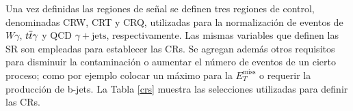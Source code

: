 Una vez definidas las regiones de señal se definen tres regiones de control, denominadas CRW, CRT y CRQ, utilizadas para la normalización de eventos de $W\gamma$, $t \overline{t}\gamma$ y QCD $\gamma + \text{jets}$, respectivamente. Las mismas variables que definen las SR son empleadas para establecer las CRs. Se agregan además otros requisitos para disminuir la contaminación o aumentar el número de eventos de un cierto proceso; como por ejemplo colocar un máximo para la $E_{T}^{\text{miss}}$ o requerir la producción de b-jets. La Tabla \ref{crs} muestra las selecciones utilizadas para definir las CRs.

\begin{table}
\centering
\caption{Criterios de selección para las CRs basadas a las SRs. Los valores son los mismos para SR$_{\text{L}}$ y SR$_{\text{H}}$\cite{ATLAS:2016fks}.}
\label{crs}
\end{table}


